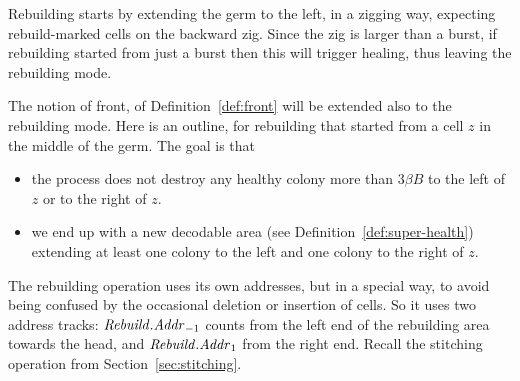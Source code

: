 \documentclass[11pt]{memoir}
\theoremstyle{definition} %
\newcommand{\fld}[1]{\ensuremath{\textit{#1\/}}}
\def\B{B}
\newcommand{\Addr}{\fld{Addr}}
\newcommand{\Rebuild}{\fld{Rebuild}}
\begin{document}
Rebuilding starts by extending the germ to the left, in a zigging way,
expecting rebuild-marked cells on the backward zig.
Since the zig is larger than a burst, if rebuilding started from just a burst then this
will trigger healing, thus leaving the rebuilding mode.

The notion of front, of Definition~\ref{def:front} will be extended also to the rebuilding mode.
Here is an outline, for rebuilding that started from a cell \( z \) in the middle
of the germ.
The goal is that
\begin{itemize}
\item the process does not destroy any healthy colony more than
  \( 3\beta\B \) to the left of \( z \) or to the right of \( z \).
\item we end up with a new decodable area
  (see Definition~\ref{def:super-health}) extending at least one colony to the
  left and one colony to the right of \( z \).
\end{itemize}
The rebuilding operation uses its own addresses, but in a special way, to avoid being
confused by the occasional deletion or insertion of cells.
So it uses two address tracks: 
\( \Rebuild.\Addr_{-1} \) counts from the left end of the rebuilding area towards the head,
and \( \Rebuild.\Addr_{1} \) from the right end.
Recall the stitching operation from Section~\ref{sec:stitching}.
\end{document}
